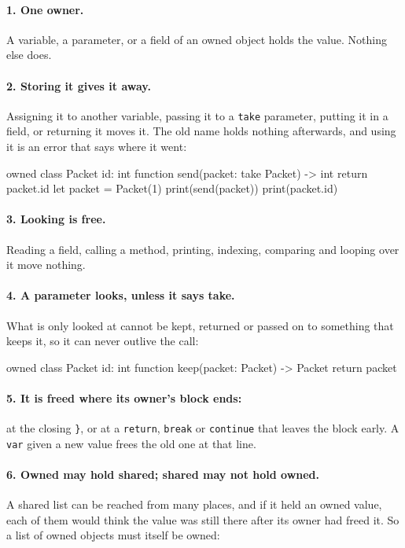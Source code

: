 \paragraph{1. One owner.} A variable, a parameter, or a field of an
owned object holds the value. Nothing else does.

\paragraph{2. Storing it gives it away.} Assigning it to another
variable, passing it to a \verb|take| parameter, putting it in a field,
or returning it moves it. The old name holds nothing afterwards, and
using it is an error that says where it went:

\begin{zeno}[fails=yes]
owned class Packet {
    id: int
}
function send(packet: take Packet) -> int {
    return packet.id
}
let packet = Packet(1)
print(send(packet))
print(packet.id)
\end{zeno}

\paragraph{3. Looking is free.} Reading a field, calling a method,
printing, indexing, comparing and looping over it move nothing.

\paragraph{4. A parameter looks, unless it says take.} What is only
looked at cannot be kept, returned or passed on to something that keeps
it, so it can never outlive the call:

\begin{zeno}[fails=yes]
owned class Packet {
    id: int
}
function keep(packet: Packet) -> Packet {
    return packet
}
\end{zeno}

\paragraph{5. It is freed where its owner's block ends:} at the
closing \verb|}|, or at a \verb|return|, \verb|break| or
\verb|continue| that leaves the block early. A \verb|var| given a new
value frees the old one at that line.

\paragraph{6. Owned may hold shared; shared may not hold owned.} A
shared list can be reached from many places, and if it held an owned
value, each of them would think the value was still there after its
owner had freed it. So a list of owned objects must itself be owned:

